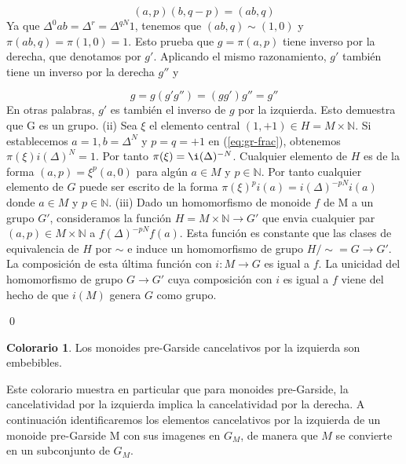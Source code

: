 \documentclass[12pt]{article}
\theoremstyle{definition}
\newtheorem{colo}{Colorario}[section]
\begin{document}
\begin{equation}
(a,p)(b,q-p)=(ab,q)
\label{eq:gr-frac}
\end{equation}
\newline
Ya que $\Delta^0ab=\Delta^r=\Delta^{qN}1$, tenemos que $(ab,q)\sim(1,0)$ y $\pi(ab,q)=\pi(1,0)=1$. Esto prueba que $g=\pi(a,p)$ tiene inverso por la derecha, que denotamos por $g'$. Aplicando el mismo razonamiento, $g'$ también tiene un inverso por la derecha  $g''$ y

$$g=g(g'g'')=(gg')g''=g''$$
\newline
En otras palabras, $g'$ es también el inverso de $g$ por la izquierda. Esto demuestra que G es un grupo.
(ii) Sea $\xi$ el elemento central $(1,+1)\in H=M\times\mathbb{N}$. Si establecemos $a=1,b=\Delta^N$ y $p=q=+1$ en (\ref{eq:gr-frac}), obtenemos $\pi(\xi)i(\Delta)^N=1$. Por tanto $\pi(\xi)=\i(\Delta)^{-N}$. Cualquier elemento de $H$ es de la forma $(a,p)=\xi^p(a,0)$ para algún $a\in M$ y $p\in\mathbb{N}$. Por tanto cualquier elemento de $G$ puede ser escrito de la forma $\pi(\xi)^pi(a)=i(\Delta)^{-pN}i(a)$ donde $a\in M$ y $p\in\mathbb{N}$.
\newline
\newline
(iii) Dado un homomorfismo de monoide $f$ de M a un grupo $G'$, consideramos la función $H=M\times \mathbb{N}\rightarrow G'$ que envia cualquier par $(a,p)\in M\times \mathbb{N}$ a $f(\Delta)^{-pN}f(a)$. Esta función es constante que las clases de equivalencia de $H$ por $\sim$ e induce un homomorfismo de grupo $H/\sim=G\rightarrow G'$. La composición de esta última función con $i:M\rightarrow G$ es igual a $f$. La unicidad del homomorfismo de grupo $G\rightarrow G'$ cuya composición con $i$ es igual a $f$ viene del hecho de que $i(M)$ genera $G$ como grupo.

\qed

\begin{colo}
Los monoides pre-Garside cancelativos por la izquierda son embebibles.
\label{colo:pre-garside-embe}
\end{colo}

Este colorario muestra en particular que para monoides pre-Garside, la cancelatividad por la izquierda implica la cancelatividad por la derecha.
\newline
\newline
A continuación identificaremos los elementos cancelativos por la izquierda de un monoide pre-Garside M con sus imagenes en $G_M$, de manera que $M$ se convierte en un subconjunto de $G_M$.
\end{document}
